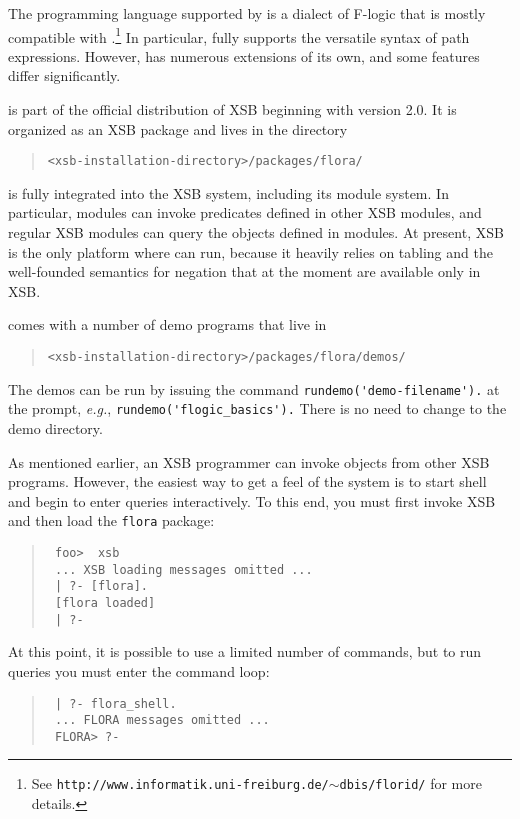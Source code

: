 \documentclass[11pt]{report}
\begin{document}
The programming language supported by \FLORA is a dialect of F-logic
that is mostly compatible with \FLORID.\footnote{
  See {\tt http://www.informatik.uni-freiburg.de/$\sim$dbis/florid/} for more
  details.
  }
In particular, \FLORA fully supports the versatile syntax of \FLORID path
expressions. However, \FLORA has numerous extensions of its own, and some
features differ significantly.

\FLORA is part of the official distribution of XSB beginning with version
2.0. It is organized as an XSB package and lives in the directory
\begin{quote}
 \verb|<xsb-installation-directory>/packages/flora/|  
\end{quote}
\FLORA is fully integrated into the XSB system, including its module
system. In particular, \FLORA modules can invoke predicates defined in
other XSB modules, and regular XSB modules can query the objects defined in
\FLORA modules. At present, XSB is the only platform where \FLORA can run,
because it heavily relies on tabling and the well-founded semantics for
negation that at the moment are available only in XSB.

\FLORA comes with a number of demo programs that live in
\begin{quote}
 \verb|<xsb-installation-directory>/packages/flora/demos/|  
\end{quote}
The demos can be run by issuing the command
\verb|rundemo('demo-filename').| at the \FLORA prompt, {\it e.g.},
\verb|rundemo('flogic_basics').|
There is no need to change to the demo directory.

As mentioned earlier, an XSB programmer can invoke \FLORA objects from
other XSB programs. However, the easiest way to get a feel of the system
is to start \FLORA shell and begin to enter queries interactively.  To
this end, you must first invoke XSB and then load the {\tt flora}
package:
\begin{quote}
  \tt
foo>~~xsb  \\
\tt
... XSB loading messages omitted ...\\
\tt
| ?- [flora].\\
\tt
[flora loaded]\\
\tt
| ?-
\end{quote}
At this point, it is possible to use a limited number of \FLORA
commands, but to run queries you must enter the \FLORA command loop:
\begin{quote}
  \tt
| ?- flora\_shell.  \\
 \tt
... FLORA messages omitted ... \\
 \tt
FLORA> ?-
\end{quote}
\end{document}
